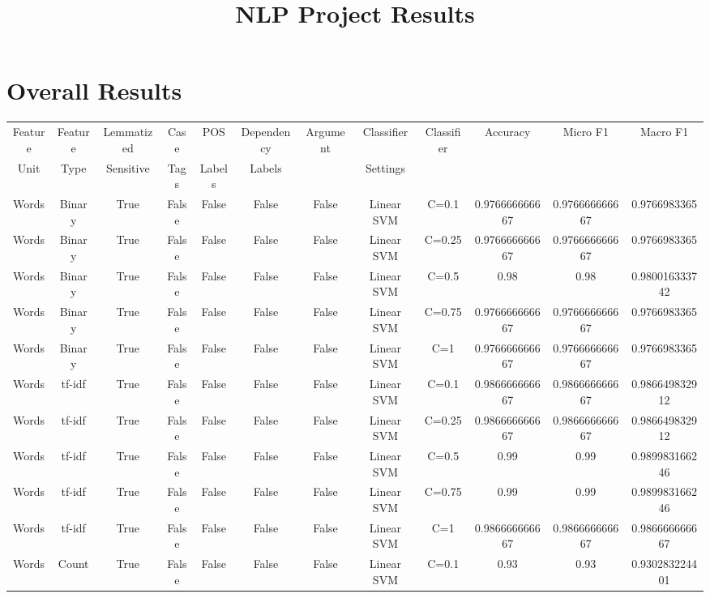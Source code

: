 \documentclass{article}
\begin{document}
  \title{NLP Project Results}

  \maketitle
  
\section{Overall Results}
    
  \begin{tabular}{|c|c|c|c|c|c|c|c|c|c|c|c|}
  \hline
  Feature  & Feature  & Lemmatized & Case  &  POS  &  Dependency  &  Argument  & Classifier & Classifier  & Accuracy & Micro F1 & Macro F1 \\
  Unit & Type & Sensitive & Tags &  Labels &  Labels & & Settings & & & &  \\
  \hline
  Words & Binary & True & False & False & False & False & Linear SVM & C=0.1 & 0.976666666667 & 0.976666666667 & 0.9766983365 \\ 
Words & Binary & True & False & False & False & False & Linear SVM & C=0.25 & 0.976666666667 & 0.976666666667 & 0.9766983365 \\ 
Words & Binary & True & False & False & False & False & Linear SVM & C=0.5 & 0.98 & 0.98 & 0.980016333742 \\ 
Words & Binary & True & False & False & False & False & Linear SVM & C=0.75 & 0.976666666667 & 0.976666666667 & 0.9766983365 \\ 
Words & Binary & True & False & False & False & False & Linear SVM & C=1 & 0.976666666667 & 0.976666666667 & 0.9766983365 \\ 
Words & tf-idf & True & False & False & False & False & Linear SVM & C=0.1 & 0.986666666667 & 0.986666666667 & 0.986649832912 \\ 
Words & tf-idf & True & False & False & False & False & Linear SVM & C=0.25 & 0.986666666667 & 0.986666666667 & 0.986649832912 \\ 
Words & tf-idf & True & False & False & False & False & Linear SVM & C=0.5 & 0.99 & 0.99 & 0.989983166246 \\ 
Words & tf-idf & True & False & False & False & False & Linear SVM & C=0.75 & 0.99 & 0.99 & 0.989983166246 \\ 
Words & tf-idf & True & False & False & False & False & Linear SVM & C=1 & 0.986666666667 & 0.986666666667 & 0.986666666667 \\ 
Words & Count & True & False & False & False & False & Linear SVM & C=0.1 & 0.93 & 0.93 & 0.930283224401 \\ 

\end{tabular}
\end{document}
